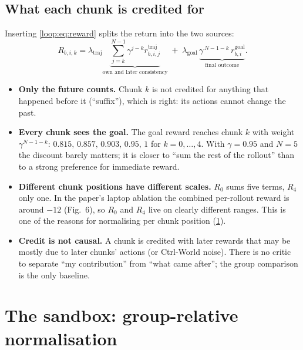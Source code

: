 \subsection{What each chunk is credited for}
Inserting \eqref{loop:eq:reward} splits the return into the two sources:
\begin{equation}
R_{b,i,k}=\lambda_{\mathrm{traj}}\underbrace{\sum_{j=k}^{N-1}\gamma^{j-k}r^{\mathrm{traj}}_{b,i,j}}_{\text{own and later consistency}}
\;+\;\lambda_{\mathrm{goal}}\,\underbrace{\gamma^{\,N-1-k}\,r^{\mathrm{goal}}_{b,i}}_{\text{final outcome}} .
\label{loop:eq:split}
\end{equation}
\begin{itemize}
\item \textbf{Only the future counts.} Chunk $k$ is not credited for anything that happened before it (``suffix''), which is right: its actions cannot change the past.
\item \textbf{Every chunk sees the goal.} The goal reward reaches chunk $k$ with weight $\gamma^{N-1-k}$: $0.815,\,0.857,\,0.903,\,0.95,\,1$ for $k=0,\dots,4$. With $\gamma=0.95$ and $N=5$ the discount barely matters; it is closer to ``sum the rest of the rollout'' than to a strong preference for immediate reward.
\item \textbf{Different chunk positions have different scales.} $R_0$ sums five terms, $R_4$ only one. In the paper's laptop ablation the combined per-rollout reward is around $-12$ (Fig.~6), so $R_0$ and $R_4$ live on clearly different ranges. This is one of the reasons for normalising per chunk position (\cref{loop:sec:sandbox}).
\item \textbf{Credit is not causal.} A chunk is credited with later rewards that may be mostly due to later chunks' actions (or Ctrl-World noise). There is no critic to separate ``my contribution'' from ``what came after''; the group comparison is the only baseline.
\end{itemize}

\section{The sandbox: group-relative normalisation }
\label{loop:sec:sandbox}


